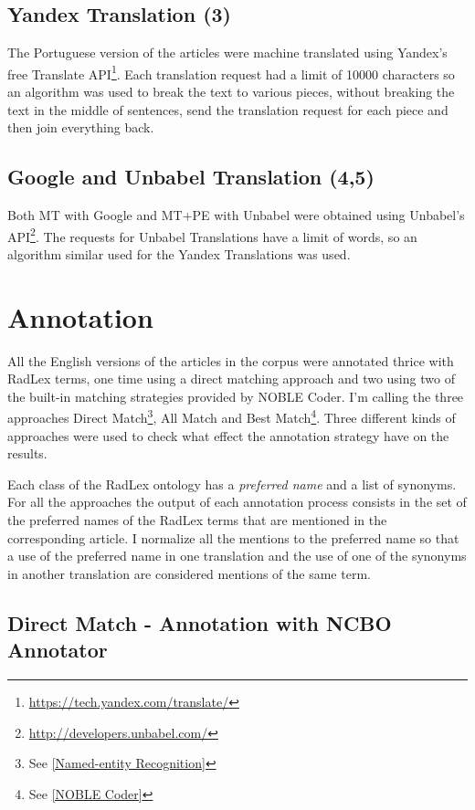 \subsection{Yandex Translation (3)}

The Portuguese version of the articles were machine translated using Yandex's free Translate API\footnote{\url{https://tech.yandex.com/translate/}}. Each translation request had a limit of 10000 characters so an algorithm was used to break the text to various pieces, without breaking the text in the middle of sentences, send the translation request for each piece and then join everything back.

\subsection{Google and Unbabel Translation (4,5)}

Both MT with Google and MT+PE with Unbabel were obtained using Unbabel's API\footnote{\url{http://developers.unbabel.com/}}. The requests for Unbabel Translations have a limit of words, so an algorithm similar used for the Yandex Translations was used. 

\section{Annotation}

All the English versions of the articles in the corpus were annotated thrice with RadLex terms, one time using a direct matching approach and two using two of the built-in matching strategies provided by NOBLE Coder. I'm calling the three approaches Direct Match\footnote{See \ref{Named-entity Recognition}}, All Match and Best Match\footnote{See \ref{NOBLE Coder}}. Three different kinds of approaches were used to check what effect the annotation strategy have on the results.

Each class of the RadLex ontology has a \textit{preferred name} and a list of synonyms. For all the approaches the output of each annotation process consists in the set of the preferred names of the RadLex terms that are mentioned in the corresponding article. I normalize all the mentions to the preferred name so that a use of the preferred name in one translation and the use of one of the synonyms in another translation are considered mentions of the same term. 

\subsection{Direct Match - Annotation with NCBO Annotator}

